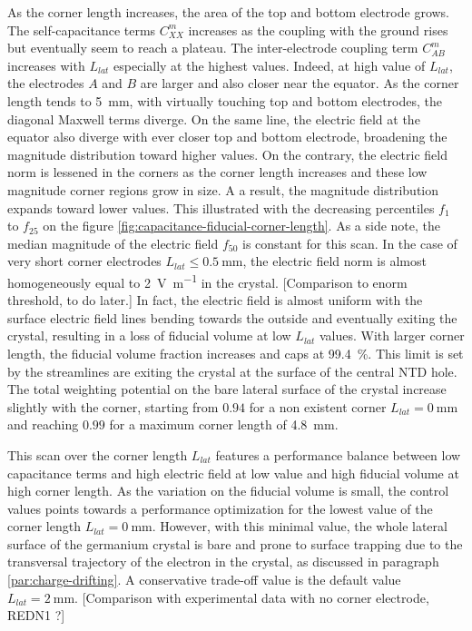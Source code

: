As the corner length increases, the area of the top and bottom electrode grows. The self-capacitance terms $C_{XX}^m$ increases as the coupling with the ground rises but eventually seem to reach a plateau. The inter-electrode coupling term $C_{AB}^m$ increases with $L_{lat}$ especially at the highest values. Indeed, at high value of $L_{lat}$, the electrodes $A$ and $B$ are larger and also closer near the equator. As the corner length tends to \SI{5}{\mm}, with virtually touching top and bottom electrodes, the diagonal Maxwell terms diverge. On the same line, the electric field at the equator also diverge with ever closer top and bottom electrode, broadening the magnitude distribution toward higher values.
On the contrary, the electric field norm is lessened in the corners as the corner length increases and these low magnitude corner regions grow in size. A a result, the magnitude distribution expands toward lower values. This illustrated with the decreasing percentiles $f_1$ to $f_{25}$ on the figure \ref{fig:capacitance-fiducial-corner-length}. As a side note, the median magnitude of the electric field $f_{50}$ is constant for this scan. In the case of very short corner electrodes $L_{lat} \leq \SI{0.5}{\mm}$, the electric field norm is almost homogeneously equal to \SI{2}{\volt\per\meter} in the crystal.
{\color{red} [Comparison to enorm threshold, to do later.]}
In fact, the electric field is almost uniform with the surface electric field lines bending towards the outside and eventually exiting the crystal, resulting in a loss of fiducial volume at low $L_{lat}$ values. With larger corner length, the fiducial volume fraction increases and caps at \SI{99.4}{\percent}. This limit is set by the streamlines are exiting the crystal at the surface of the central NTD hole.
The total weighting potential on the bare lateral surface of the crystal increase slightly with the corner, starting from $0.94$ for a non existent corner $L_{lat}=\SI{0}{\mm}$ and reaching $0.99$ for a maximum corner length of \SI{4.8}{\mm}.   

This scan over the corner length $L_{lat}$ features a performance balance between low capacitance terms and high electric field at low value and high fiducial volume at high corner length. As the variation on the fiducial volume is small, the control values points towards a performance optimization for the lowest value of the corner length $L_{lat}=\SI{0}{\mm}$. However, with this minimal value, the whole lateral surface of the germanium crystal is bare and prone to surface trapping due to the transversal trajectory of the electron in the crystal, as discussed in paragraph \ref{par:charge-drifting}. A conservative trade-off value is the default value $L_{lat}=\SI{2}{\mm}$.
{\color{red} [Comparison with experimental data with no corner electrode, REDN1 ?]}

